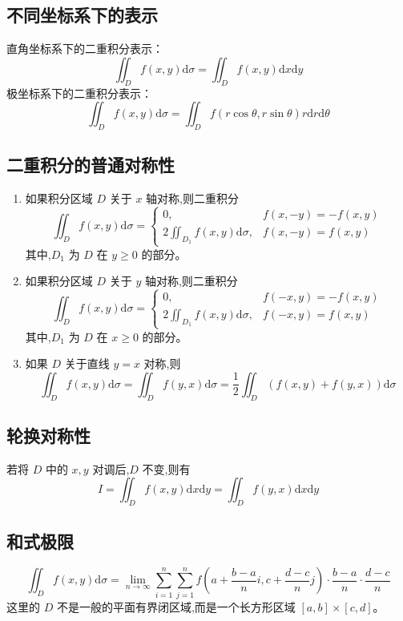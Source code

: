\documentclass[UTF8]{ctexart}
\theoremstyle{remark}
\begin{document}
	\subsection{不同坐标系下的表示}
	直角坐标系下的二重积分表示：
	\[
	\iint_{D} f(x,y) \mathrm{d}\sigma = \iint_{D} f(x,y) \mathrm{d}x\mathrm{d}y
	\]
	极坐标系下的二重积分表示：
	\[
	\iint_{D} f(x,y) \mathrm{d}\sigma = \iint_{D} f(r\cos\theta, r\sin\theta) r \mathrm{d}r\mathrm{d}\theta
	\]
	
	\subsection{二重积分的普通对称性}
	\begin{enumerate}
		\item 如果积分区域 \(D\) 关于 \(x\) 轴对称,则二重积分
		\[
		\iint_{D} f(x,y) \mathrm{d}\sigma = 
		\begin{cases}
			0, & f(x,-y)=-f(x,y)\\
			2\iint_{D_1} f(x,y) \mathrm{d}\sigma, & f(x,-y)=f(x,y)
		\end{cases}
		\]
		其中,\(D_1\) 为 \(D\) 在 \(y\geq0\) 的部分。
		\item 如果积分区域 \(D\) 关于 \(y\) 轴对称,则二重积分
		\[
		\iint_{D} f(x,y) \mathrm{d}\sigma = 
		\begin{cases}
			0, & f(-x,y)=-f(x,y)\\
			2\iint_{D_1} f(x,y) \mathrm{d}\sigma, & f(-x,y)=f(x,y)
		\end{cases}
		\]
		其中,\(D_1\) 为 \(D\) 在 \(x\geq0\) 的部分。
		\item 如果 \(D\) 关于直线 \(y = x\) 对称,则
		\[
		\iint_{D} f(x,y) \mathrm{d}\sigma = \iint_{D} f(y,x) \mathrm{d}\sigma = \frac{1}{2}\iint_{D} (f(x,y)+f(y,x)) \mathrm{d}\sigma
		\]
	\end{enumerate}
	
	\subsection{轮换对称性}
	若将 \(D\) 中的 \(x, y\) 对调后,\(D\) 不变,则有
	\[
	I = \iint_{D} f(x,y) \mathrm{d}x\mathrm{d}y = \iint_{D} f(y,x) \mathrm{d}x\mathrm{d}y
	\]
	
	\subsection{和式极限}
	\[
	\iint_{D} f(x,y) \mathrm{d}\sigma = \lim_{n \to \infty} \sum_{i = 1}^{n} \sum_{j = 1}^{n} f\left(a + \frac{b - a}{n}i, c + \frac{d - c}{n}j\right) \cdot \frac{b - a}{n} \cdot \frac{d - c}{n}
	\]
	这里的 \(D\) 不是一般的平面有界闭区域,而是一个长方形区域 \([a,b] \times [c,d]\)。
	
\end{document}
